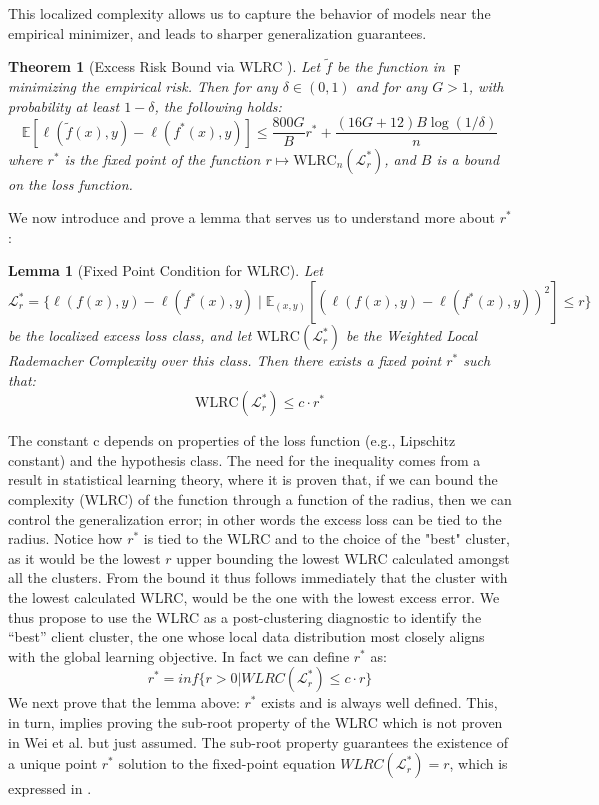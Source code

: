 \documentclass{article}
\newtheorem{theorem}{Theorem}
\newtheorem{lemma}{Lemma}
\begin{document}
This localized complexity allows us to capture the behavior of models near the empirical minimizer, and leads to sharper generalization guarantees.

\begin{theorem}[Excess Risk Bound via WLRC {\cite{WLRC}}]
Let \( \tilde{f} \) be the function in \( \digamma \) minimizing the empirical risk. Then for any \( \delta \in (0, 1) \) and for any \( G > 1 \), with probability at least \( 1 - \delta \), the following holds:
\[
\mathbb{E}[\ell(\tilde{f}(x), y) - \ell(f^*(x), y)] \leq \frac{800G}{B}r^* + \frac{(16G + 12)B \log(1/\delta)}{n}
\]
where \( r^* \) is the fixed point of the function \( r \mapsto \text{WLRC}_n(\mathcal{L}^*_r) \), and \( B \) is a bound on the loss function.
\end{theorem}
We now introduce and prove a lemma that serves us to understand more about $r^*$:
 \begin{lemma}[Fixed Point Condition for WLRC]
Let $\mathcal{L}_r^* = \{ \ell(f(x),y) - \ell(f^*(x),y) \mid \mathbb{E}_{(x,y)}[(\ell(f(x),y) - \ell(f^*(x),y))^2] \leq r \}$ 
be the localized excess loss class, and let $\text{WLRC}(\mathcal{L}_r^*)$ be the 
Weighted Local Rademacher Complexity over this class. Then there exists 
a fixed point $r^*$ such that:
\[
\text{WLRC}(\mathcal{L}_{r}^*) \leq c \cdot r^*
\]
\end{lemma}
The constant c depends on properties of the loss function (e.g., Lipschitz constant) and the hypothesis class. The need for the inequality comes from a result in statistical learning theory, where it is proven that, if we can bound the complexity (WLRC) of the function through a function of the radius, then we can control the generalization error; in other words the excess loss can be tied to the radius.
Notice how $r^*$ is tied to the WLRC and to the choice of the "best" cluster, as it would be the lowest $r$ upper bounding the lowest WLRC calculated amongst all the clusters. From the bound it thus follows immediately that the cluster with the lowest calculated WLRC, would be the one with the lowest excess error. We thus propose to use the WLRC as a post-clustering diagnostic to identify the “best” client cluster,  the one whose local data distribution most closely aligns with the global learning objective. 
In fact we can define $r^*$ as:
\begin{equation}
    r^* = inf\{ r > 0 | WLRC(\mathcal{L}_{r}^{*}) \leq c \cdot r\}
\end{equation}
We next prove that the lemma above: $r^*$ exists and is always well defined. This, in turn, implies proving the sub-root property of the WLRC which is not proven in Wei et al. but just assumed. The sub-root property guarantees the existence of a unique point $r^*$ solution to the fixed-point equation $WLRC(\mathcal{L}_r^*)=r$, which is expressed in \cite{WLRC}.
\end{document}

